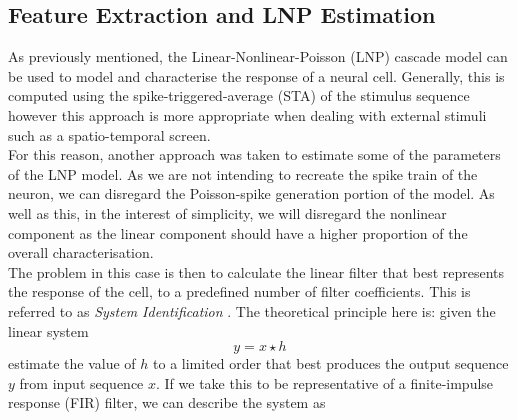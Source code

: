 \subsection{Feature Extraction and LNP Estimation}
As previously mentioned, the Linear-Nonlinear-Poisson (LNP) cascade model can be used to model and characterise the response of a neural cell. Generally, this is computed using the spike-triggered-average (STA) of the stimulus sequence \cite{lnpInBrain} however this approach is more appropriate when dealing with external stimuli such as a spatio-temporal screen.\\
For this reason, another approach was taken to estimate some of the parameters of the LNP model. As we are not intending to recreate the spike train of the neuron, we can disregard the Poisson-spike generation portion of the model. As well as this, in the interest of simplicity, we will disregard the nonlinear component as the linear component should have a higher proportion of the overall characterisation.\\
The problem in this case is then to calculate the linear filter that best represents the response of the cell, to a predefined number of filter coefficients. This is referred to as \emph{System Identification} \cite{sysIdA}\cite{sysIdB}. The theoretical principle here is: given the linear system 
\begin{equation}
    \label{eq:firLinSys}
    y = x \star h
\end{equation}
estimate the value of $h$ to a limited order that best produces the output sequence $y$ from input sequence $x$. If we take this to be representative of a finite-impulse response (FIR) filter, we can describe the system as

